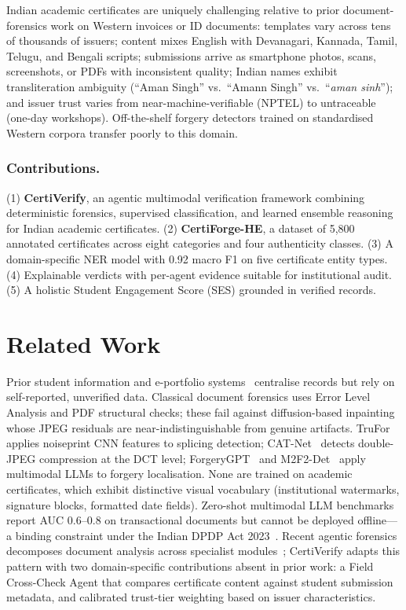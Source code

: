 \documentclass[runningheads]{llncs}
\begin{document}
Indian academic certificates are uniquely challenging relative to prior document-forensics work on Western invoices or ID documents: templates vary across tens of thousands of issuers; content mixes English with Devanagari, Kannada, Tamil, Telugu, and Bengali scripts; submissions arrive as smartphone photos, scans, screenshots, or PDFs with inconsistent quality; Indian names exhibit transliteration ambiguity (``Aman Singh'' vs.\ ``Amann Singh'' vs.\ ``\textit{aman sinh}''); and issuer trust varies from near-machine-verifiable (NPTEL) to untraceable (one-day workshops). Off-the-shelf forgery detectors trained on standardised Western corpora transfer poorly to this domain.

\subsubsection{Contributions.}
(1) \textbf{CertiVerify}, an agentic multimodal verification framework combining deterministic forensics, supervised classification, and learned ensemble reasoning for Indian academic certificates. (2) \textbf{CertiForge-HE}, a dataset of 5{,}800 annotated certificates across eight categories and four authenticity classes. (3) A domain-specific NER model with 0.92 macro F1 on five certificate entity types. (4) Explainable verdicts with per-agent evidence suitable for institutional audit. (5) A holistic Student Engagement Score (SES) grounded in verified records.

\section{Related Work}
\label{sec:related}

Prior student information and e-portfolio systems~\cite{balasubramanian2017,khandare2021,alqahtani2020} centralise records but rely on self-reported, unverified data. Classical document forensics uses Error Level Analysis and PDF structural checks; these fail against diffusion-based inpainting whose JPEG residuals are near-indistinguishable from genuine artifacts. TruFor~\cite{guillaro2023} applies noiseprint CNN features to splicing detection; CAT-Net~\cite{kwon2022} detects double-JPEG compression at the DCT level; ForgeryGPT~\cite{zhang2024} and M2F2-Det~\cite{guo2025} apply multimodal LLMs to forgery localisation. None are trained on academic certificates, which exhibit distinctive visual vocabulary (institutional watermarks, signature blocks, formatted date fields). Zero-shot multimodal LLM benchmarks~\cite{chen2025} report AUC 0.6--0.8 on transactional documents but cannot be deployed offline---a binding constraint under the Indian DPDP Act 2023~\cite{dpdp2023}. Recent agentic forensics decomposes document analysis across specialist modules~\cite{docagent2025}; CertiVerify adapts this pattern with two domain-specific contributions absent in prior work: a Field Cross-Check Agent that compares certificate content against student submission metadata, and calibrated trust-tier weighting based on issuer characteristics.
\end{document}
